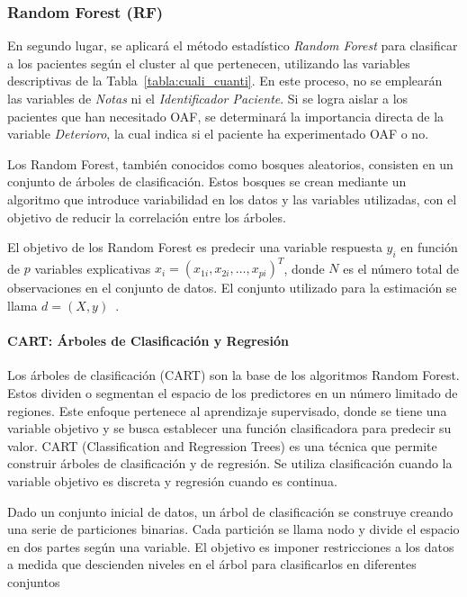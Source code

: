 \subsubsection{Random Forest (RF)}\label{sec:rf}

En segundo lugar, se aplicará el método estadístico \textit{Random Forest} para clasificar a los pacientes según el cluster al que pertenecen, utilizando las variables descriptivas de la Tabla~\ref{tabla:cuali_cuanti}. En este proceso, no se emplearán las variables de \textit{Notas} ni el \textit{Identificador Paciente}. Si se logra aislar a los pacientes que han necesitado OAF, se determinará la importancia directa de la variable \textit{Deterioro}, la cual indica si el paciente ha experimentado OAF o no.

Los Random Forest, también conocidos como bosques aleatorios, consisten en un conjunto de árboles de clasificación. Estos bosques se crean mediante un algoritmo que introduce variabilidad en los datos y las variables utilizadas, con el objetivo de reducir la correlación entre los árboles.

El objetivo de los Random Forest es predecir una variable respuesta \(y_i\) en función de \(p\) variables explicativas \(x_i = (x_{1i}, x_{2i}, \ldots, x_{pi})^T\), donde \(N\) es el número total de observaciones en el conjunto de datos. El conjunto utilizado para la estimación se llama \(d = (X, y)\)~\cite{ho1995random}.


\paragraph{CART: Árboles de Clasificación y Regresión}
Los árboles de clasificación (CART) son la base de los algoritmos Random Forest. Estos dividen o segmentan el espacio de los predictores en un número limitado de regiones. Este enfoque pertenece al aprendizaje supervisado, donde se tiene una variable objetivo y se busca establecer una función clasificadora para predecir su valor. CART (Classification and Regression Trees) es una técnica que permite construir árboles de clasificación y de regresión. Se utiliza clasificación cuando la variable objetivo es discreta y regresión cuando es continua.

Dado un conjunto inicial de datos, un árbol de clasificación se construye creando una serie de particiones binarias. Cada partición se llama nodo y divide el espacio en dos partes según una variable. El objetivo es imponer restricciones a los datos a medida que descienden niveles en el árbol para clasificarlos en diferentes conjuntos \cite{wu2008top}

